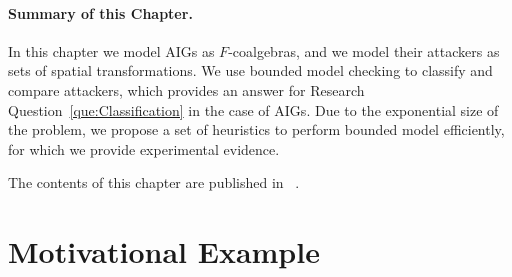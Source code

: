 \paragraph{Summary of this Chapter.} In this chapter we model AIGs as $F$-coalgebras, and we model their attackers as sets of spatial transformations. We use bounded model checking to classify and compare attackers, which provides an answer for Research Question~\ref{que:Classification} in the case of AIGs. Due to the exponential size of the problem, we propose a set of heuristics to perform bounded model efficiently, for which we provide experimental evidence.

The contents of this chapter are published in ~\cite{ClassificationOfAttackers}.

\section{Motivational Example}
\label{sec:Classification:Example}

